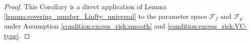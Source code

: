 \documentclass[12pt]{article}
\newtheorem{lemma}{Lemma}%
\begin{document}
\begin{proof}
    This Corollary is a direct application of Lemma \ref{lemma:covering_number_Linfty_universal} to the parameter space $\mathcal{F}_f$ and $\mathcal{F}_p$ under Assumption \ref{condition:excess_risk:smooth} and \ref{condition:excess_risk:VC-type}.
\end{proof}




\end{document}
